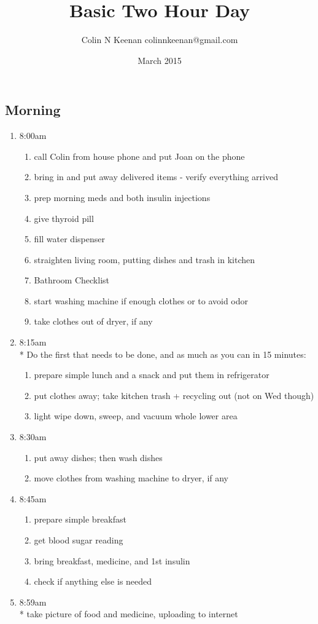 \documentclass[12pt,letterpaper]{article}
\newcommand{\mytitle}{Basic Two Hour Day}
\begin{document}
\title{\mytitle{}}
\author{Colin N Keenan colinnkeenan@gmail.com}
\date{March 2015}
\begin{multicols}{2} 
\subsection*{Morning}
\begin{enumerate}
	\item 8:00am
		\begin{enumerate}
			\item call Colin from house phone and put Joan on the phone
			\item bring in and put away delivered items - verify everything arrived
			\item prep morning meds and both insulin injections
			\item give thyroid pill
			\item fill water dispenser
			\item straighten living room, putting dishes and trash in kitchen
			\item Bathroom Checklist
			\item start washing machine if enough clothes or to avoid odor
			\item take clothes out of dryer, if any
		\end{enumerate}
	\item 8:15am \\*
		Do the first that needs to be done, and as much as you can in 15 minutes:
		\begin{enumerate}
			\item prepare simple lunch and a snack and put them in refrigerator
			\item put clothes away; take kitchen trash + recycling out (not on Wed though)
			\item light wipe down, sweep, and vacuum whole lower area
		\end{enumerate}
	\item 8:30am
		\begin{enumerate}
			\item put away dishes; then wash dishes
			\item move clothes from washing machine to dryer, if any
		\end{enumerate}
	\item 8:45am
		\begin{enumerate}
			\item prepare simple breakfast
			\item get blood sugar reading
			\item bring breakfast, medicine, and 1st insulin
			\item check if anything else is needed
		\end{enumerate}
	\item 8:59am \\*
		take picture of food and medicine, uploading to internet
\end{enumerate}
\vfill
\columnbreak


\end{multicols}
\end{document}
